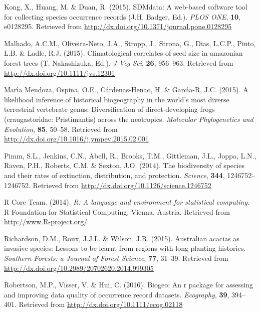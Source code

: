 \documentclass[3p]{elsarticle} %
\newlength{\cslhangindent}
\newenvironment{cslreferences}%
  {\setlength{\parindent}{0pt}%
  \everypar{\setlength{\hangindent}{\cslhangindent}}\ignorespaces}%
  {\par}
\begin{document}
\begin{cslreferences}
\leavevmode\hypertarget{ref-Kong_2015}{}%
Kong, X., Huang, M. \& Duan, R. (2015). SDMdata: A web-based software
tool for collecting species occurrence records (J.H. Badger, Ed.).
\emph{PLOS ONE}, \textbf{10}, e0128295. Retrieved from
\url{http://dx.doi.org/10.1371/journal.pone.0128295}

\leavevmode\hypertarget{ref-Malhado_2015}{}%
Malhado, A.C.M., Oliveira-Neto, J.A., Stropp, J., Strona, G., Dias,
L.C.P., Pinto, L.B. \& Ladle, R.J. (2015). Climatological correlates of
seed size in amazonian forest trees (T. Nakashizuka, Ed.). \emph{J Veg
Sci}, \textbf{26}, 956--963. Retrieved from
\url{http://dx.doi.org/10.1111/jvs.12301}

\leavevmode\hypertarget{ref-Mendoza_2015}{}%
Marı́a Mendoza, Ospina, O.E., Cárdenas-Henao, H. \& Garcı́a-R, J.C.
(2015). A likelihood inference of historical biogeography in the world's
most diverse terrestrial vertebrate genus: Diversification of
direct-developing frogs (craugastoridae: Pristimantis) across the
neotropics. \emph{Molecular Phylogenetics and Evolution}, \textbf{85},
50--58. Retrieved from
\url{http://dx.doi.org/10.1016/j.ympev.2015.02.001}

\leavevmode\hypertarget{ref-Pimm_2014}{}%
Pimm, S.L., Jenkins, C.N., Abell, R., Brooks, T.M., Gittleman, J.L.,
Joppa, L.N., Raven, P.H., Roberts, C.M. \& Sexton, J.O. (2014). The
biodiversity of species and their rates of extinction, distribution, and
protection. \emph{Science}, \textbf{344}, 1246752--1246752. Retrieved
from \url{http://dx.doi.org/10.1126/science.1246752}

\leavevmode\hypertarget{ref-R}{}%
R Core Team. (2014). \emph{R: A language and environment for statistical
computing}. R Foundation for Statistical Computing, Vienna, Austria.
Retrieved from \url{http://www.R-project.org/}

\leavevmode\hypertarget{ref-Richardson_2015}{}%
Richardson, D.M., Roux, J.J.L. \& Wilson, J.R. (2015). Australian
acacias as invasive species: Lessons to be learnt from regions with long
planting histories. \emph{Southern Forests: a Journal of Forest
Science}, \textbf{77}, 31--39. Retrieved from
\url{http://dx.doi.org/10.2989/20702620.2014.999305}

\leavevmode\hypertarget{ref-Robertson_2016}{}%
Robertson, M.P., Visser, V. \& Hui, C. (2016). Biogeo: An r package for
assessing and improving data quality of occurrence record datasets.
\emph{Ecography}, \textbf{39}, 394--401. Retrieved from
\url{http://dx.doi.org/10.1111/ecog.02118}


\end{cslreferences}
\end{document}
